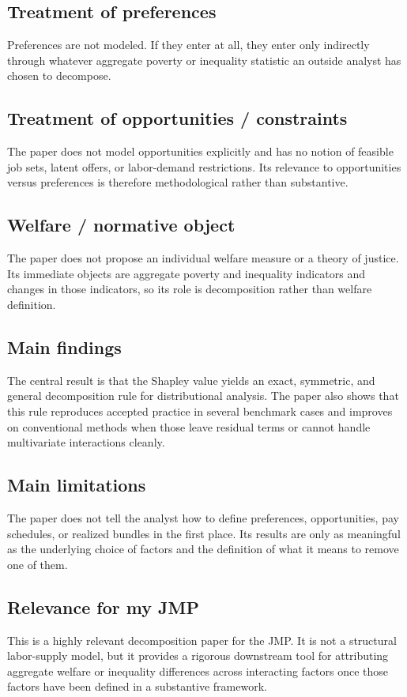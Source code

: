 \documentclass[11pt,a4paper]{article}
\begin{document}
\subsection*{Treatment of preferences}
Preferences are not modeled. If they enter at all, they enter only indirectly through whatever aggregate poverty or inequality statistic an outside analyst has chosen to decompose.

\subsection*{Treatment of opportunities / constraints}
The paper does not model opportunities explicitly and has no notion of feasible job sets, latent offers, or labor-demand restrictions. Its relevance to opportunities versus preferences is therefore methodological rather than substantive.

\subsection*{Welfare / normative object}
The paper does not propose an individual welfare measure or a theory of justice. Its immediate objects are aggregate poverty and inequality indicators and changes in those indicators, so its role is decomposition rather than welfare definition.

\subsection*{Main findings}
The central result is that the Shapley value yields an exact, symmetric, and general decomposition rule for distributional analysis. The paper also shows that this rule reproduces accepted practice in several benchmark cases and improves on conventional methods when those leave residual terms or cannot handle multivariate interactions cleanly.

\subsection*{Main limitations}
The paper does not tell the analyst how to define preferences, opportunities, pay schedules, or realized bundles in the first place. Its results are only as meaningful as the underlying choice of factors and the definition of what it means to remove one of them.

\subsection*{Relevance for my JMP}
This is a highly relevant decomposition paper for the JMP. It is not a structural labor-supply model, but it provides a rigorous downstream tool for attributing aggregate welfare or inequality differences across interacting factors once those factors have been defined in a substantive framework.
\end{document}
